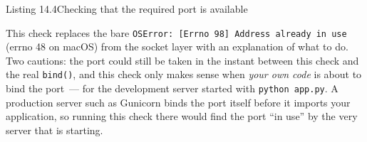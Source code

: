 \begin{codeboxcap}{\textcolor{accent}{Listing 14.4}\enspace Checking that the required port is available}

\begin{Shaded}
\begin{Highlighting}[]

\NormalTok{):}
\NormalTok{)}
        \NormalTok{:}
          
            \OperatorTok{==}
                \NormalTok{(}
                    \SpecialCharTok{\{}\SpecialCharTok{\}}\SpecialCharTok{\{}\SpecialCharTok{\}}
                    \SpecialCharTok{\{}\SpecialCharTok{\}}\NormalTok{,}
                    \OperatorTok{=}
\NormalTok{                )}
\NormalTok{)}
\end{Highlighting}
\end{Shaded}

\end{codeboxcap}

\noindent{}This check replaces the bare \texttt{OSError:}\allowbreak{}\texttt{\ {[}Errno\ 98{]}\ Address\ already\ in\ use} (errno 48 on macOS) from the socket layer with an explanation of what to do. Two cautions: the port could still be taken in the instant between this check and the real \texttt{bind()}, and this check only makes sense when \emph{your own code} is about to bind the port~--- for the development server started with \texttt{python\ app.py}. A production server such as Gunicorn binds the port itself before it imports your application, so running this check there would find the port ``in use'' by the very server that is starting.

